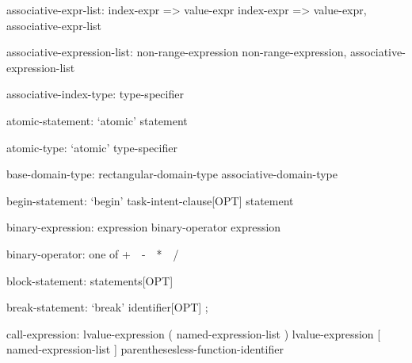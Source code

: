 \begin{syntax}
associative-expr-list:
  index-expr => value-expr
  index-expr => value-expr, associative-expr-list
\end{syntax}

\begin{syntax}
associative-expression-list:
   non-range-expression
   non-range-expression, associative-expression-list
\end{syntax}

\begin{syntax}
associative-index-type:
  type-specifier
\end{syntax}

\begin{syntax}
atomic-statement:
  `atomic' statement
\end{syntax}

\begin{syntax}
atomic-type:
  `atomic' type-specifier
\end{syntax}

\begin{syntax}
base-domain-type:
  rectangular-domain-type
  associative-domain-type
\end{syntax}

\begin{syntax}
begin-statement:
  `begin' task-intent-clause[OPT] statement
\end{syntax}

\begin{syntax}
binary-expression:
  expression binary-operator expression
\end{syntax}

\begin{syntax}
binary-operator: one of
  + $ $ $ $ - $ $ $ $ * $ $ $ $ / $ $ $ $ %
\end{syntax}

\begin{syntax}
block-statement:
  { statements[OPT] }
\end{syntax}

\begin{syntax}
break-statement:
  `break' identifier[OPT] ;
\end{syntax}

\begin{syntax}
call-expression:
  lvalue-expression ( named-expression-list )
  lvalue-expression [ named-expression-list ]
  parenthesesless-function-identifier
\end{syntax}

